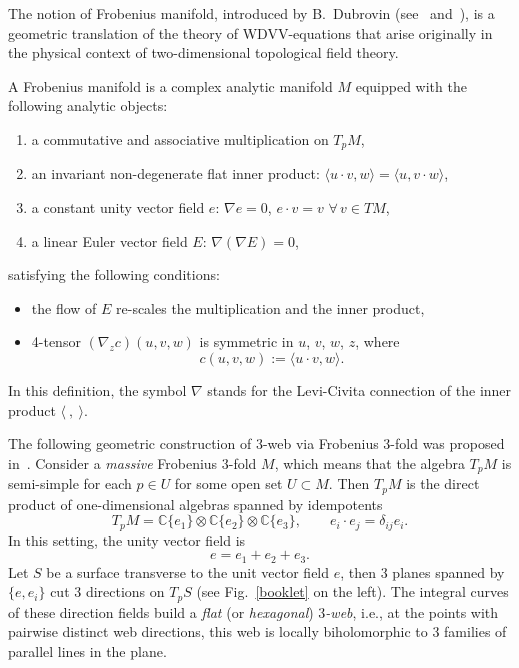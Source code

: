 \documentclass[pdftex]{sigma}
\begin{document}
The notion of Frobenius manifold, introduced by B.~Dubrovin (see~\cite{Df} and~\cite{Mf}), is a geometric translation of the theory of WDVV-equations that arise originally in the physical context of two-dimensional topological f\/ield theory.
\begin{definition}\label{defFrob}
A Frobenius manifold is a complex analytic manifold $M$ equipped with the following
analytic objects:
\begin{enumerate}\itemsep=0pt
\item[1)] a commutative and associative multiplication on $T_pM$,
\item[2)] an invariant non-degenerate f\/lat inner product: $\langle u \cdot v, w \rangle = \langle u, v \cdot w \rangle $,
\item[3)] a constant unity vector f\/ield $e$: $\nabla e=0$, $e \cdot v=v$ $\forall\, v\in TM$,
\item[4)] a linear Euler vector f\/ield $E$: $\nabla (\nabla E)=0$,
\end{enumerate}
satisfying the following conditions:
\begin{itemize}\itemsep=0pt
\item the f\/low of $E$ re-scales the
multiplication and the inner product,
\item 4-tensor $(\nabla_z c)(u,v,w)$ is symmetric in
$u$, $v$, $w$, $z$, where
\[
c(u,v,w):=\langle u\cdot v,w\rangle.
\]
\end{itemize}
In this def\/inition, the symbol $\nabla$ stands for the Levi-Civita connection of the inner product $\langle\ ,\ \rangle$.
\end{definition}
The following geometric construction of $3$-web via Frobenius $3$-fold was proposed in~\cite{Aw}.
Consider a {\it massive} Frobenius $3$-fold $M$, which means that the algebra $T_pM$ is semi-simple for each $p\in U$ for some open set $U\subset M$. Then $T_pM$ is the direct
product of one-dimensional algebras spanned by idempotents
\begin{equation}\label{mult}
T_pM=\mathbb C \{e_1\}\otimes \mathbb C \{e_2\}\otimes \mathbb C\{e_3\}, \qquad e_i\cdot e_j=\delta_{ij}e_i.
\end{equation}
In this setting, the unity vector f\/ield is
\[
e=e_1+e_2+e_3.
\]
Let $S$ be a surface transverse to the unit vector f\/ield $e$, then 3
planes spanned by $\{e,e_i\}$ cut 3 directions on $T_pS$ (see Fig.~\ref{booklet} on the left).
The integral curves of these direction f\/ields build a {\it flat} (or {\it hexagonal}) {\it $3$-web}, i.e., at the points with pairwise distinct web directions, this web is locally biholomorphic to 3 families of parallel lines in the plane.
\end{document}
